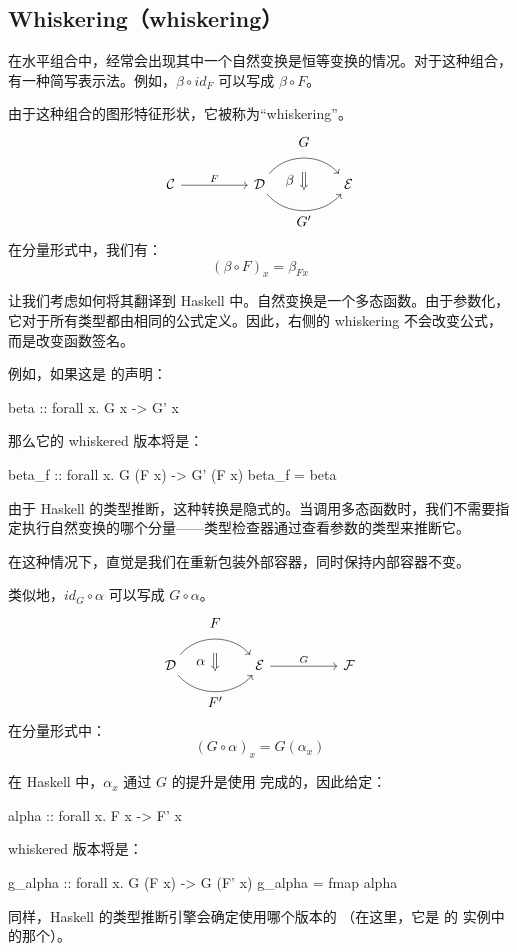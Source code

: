 \documentclass[DaoFP]{subfiles}
\begin{document}
\subsection{Whiskering（whiskering）}

在水平组合中，经常会出现其中一个自然变换是恒等变换的情况。对于这种组合，有一种简写表示法。例如，$\beta \circ id_F$ 可以写成 $\beta \circ F$。

由于这种组合的图形特征形状，它被称为“whiskering”。
\[
\begin{tikzcd}[column sep=huge]
\mathcal{C}
 \arrow[r, "F"]
 &
\mathcal{D}
  \arrow[bend left=50]{r}[name=U1, label=above:$G$]{}
  \arrow[bend right=50]{r}[name=D1, label=below:$G'$]{} 
 &
\mathcal{E}
  \arrow[shorten <=10pt,shorten >=10pt,Rightarrow,to path={(U1) -- node[label=left:$\beta$] {} (D1)}]{}
\end{tikzcd}
\]
在分量形式中，我们有：
\[ (\beta \circ F)_x = \beta_{F x} \]

让我们考虑如何将其翻译到 Haskell 中。自然变换是一个多态函数。由于参数化，它对于所有类型都由相同的公式定义。因此，右侧的 whiskering 不会改变公式，而是改变函数签名。

例如，如果这是  的声明：
\begin{haskell}
beta :: forall x. G x -> G' x
\end{haskell}
那么它的 whiskered 版本将是：
\begin{haskell}
beta_f :: forall x. G (F x) -> G' (F x)
beta_f = beta
\end{haskell}
由于 Haskell 的类型推断，这种转换是隐式的。当调用多态函数时，我们不需要指定执行自然变换的哪个分量——类型检查器通过查看参数的类型来推断它。

在这种情况下，直觉是我们在重新包装外部容器，同时保持内部容器不变。

类似地，$id_G \circ \alpha$ 可以写成 $G \circ \alpha$。
\[
\begin{tikzcd}[column sep=huge]
\mathcal{D}
  \arrow[bend left=50]{r}[name=U, label=above:$F$]{}
  \arrow[bend right=50]{r}[name=D, label=below:$F'$]{} 
 &
\mathcal{E}
\arrow[r, "G"]
&
\mathcal{F}
  \arrow[shorten <=10pt,shorten >=10pt,Rightarrow,to path={(U) -- node[label=left:$\alpha$] {} (D)}]{}
\end{tikzcd}
\]
在分量形式中：
\[(G \circ \alpha)_x = G (\alpha_x) \]

在 Haskell 中，$\alpha_x$ 通过 $G$ 的提升是使用  完成的，因此给定：
\begin{haskell}
alpha :: forall x. F x -> F' x
\end{haskell}
whiskered 版本将是：
\begin{haskell}
g_alpha :: forall x. G (F x) -> G (F' x)
g_alpha = fmap alpha
\end{haskell}
同样，Haskell 的类型推断引擎会确定使用哪个版本的 （在这里，它是  的  实例中的那个）。
\end{document}
